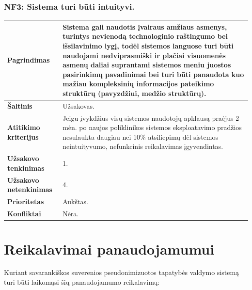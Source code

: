 \documentclass[12pt]{article}
\begin{document}
\subsubsection*{NF3: Sistema turi būti intuityvi.}
\label{sec:NF3}
\begin{table}[htb!]
    \captionsetup{justification=centering}
    \begin{tabular}{|m{4.9cm}|m{11cm}|}
        \hline
        \raggedleft \textbf{\cellcolor{deepchampagne}Pagrindimas} &
        Sistema gali naudotis įvairaus amžiaus asmenys, turintys nevienodą
        technologinio raštingumo bei išsilavinimo lygį, todėl sistemos languose
        turi būti naudojami nedviprasmiški ir plačiai visuomenės asmenų daliai
        suprantami sistemos meniu juostos pasirinkimų pavadinimai bei turi būti
        panaudota kuo mažiau kompleksinių informacijos pateikimo struktūrų
        (pavyzdžiui, medžio struktūrų). \\
        \hline
        \raggedleft \textbf{\cellcolor{deepchampagne}Šaltinis} & Užsakovas. \\
        \hline
        \raggedleft \textbf{\cellcolor{deepchampagne}Atitikimo kriterijus} & 
        Jeigu įvykdžius visų sistemos naudotojų apklausą praėjus 2 mėn. po
        naujos poliklinikos sistemos eksploatavimo pradžios nesulaukta daugiau
        nei 10\% atsiliepimų dėl sistemos neintuityvumo, nefunkcinis
        reikalavimas įgyvendintas. \\
        \hline
        \raggedleft \textbf{\cellcolor{deepchampagne}Užsakovo tenkinimas} & 1. \\
        \hline
        \raggedleft \textbf{\cellcolor{deepchampagne}Užsakovo netenkinimas} & 4. \\
        \hline
        \raggedleft \textbf{\cellcolor{deepchampagne}Prioritetas} & Aukštas. \\
        \hline
        \raggedleft \textbf{\cellcolor{deepchampagne}Konfliktai} & Nėra. \\
        \hline
    \end{tabular}
\end{table}

\section{Reikalavimai panaudojamumui}
Kuriant savarankiškos suverenios pseudonimizuotos tapatybės valdymo sistemą
turi būti laikomąsi šių panaudojamumo reikalavimų:
\end{document}
